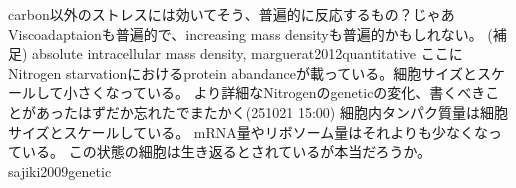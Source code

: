 carbon以外のストレスには効いてそう、普遍的に反応するもの？じゃあViscoadaptaionも普遍的で、increasing mass densityも普遍的かもしれない。
(補足)
absolute intracellular mass density, marguerat2012quantitative
ここにNitrogen starvationにおけるprotein abandanceが載っている。細胞サイズとスケールして小さくなっている。
より詳細なNitrogenのgeneticの変化、書くべきことがあったはずだか忘れたでまたかく(251021 15:00)
細胞内タンパク質量は細胞サイズとスケールしている。
mRNA量やリボソーム量はそれよりも少なくなっている。
この状態の細胞は生き返るとされているが本当だろうか。
sajiki2009genetic
